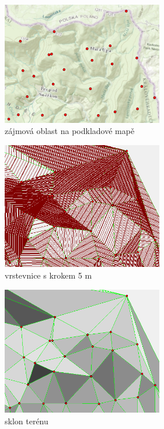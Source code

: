 \begin{figure}[H]

\begin{subfigure}{.475\linewidth}
\centering
  \includegraphics[width=7cm]{images/case2.png}
  \caption{zájmová oblast na podkladové mapě}
  \label{MLEDdet}
\end{subfigure}\hfill %
\begin{subfigure}{.475\linewidth}
\centering
  \includegraphics[width=7cm]{images/case2m5.png}
  \caption{vrstevnice s krokem 5 m}
  \label{energydetPSK}
\end{subfigure}\hfill
\medskip
\medskip
\begin{subfigure}{.475\linewidth}
\centering
  \includegraphics[width=7cm]{images/case2s.png}
  \caption{sklon terénu}
  \label{MLEDdet}
\end{subfigure}\hfill %
\begin{subfigure}{.475\linewidth}

\end{subfigure}
\end{figure}
